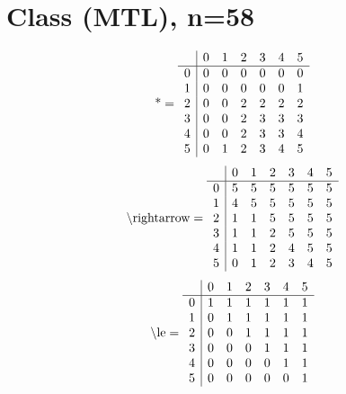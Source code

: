 \documentclass[11pt]{article}
\begin{document}
\section{Class (MTL), n=58}
\[\text{*} = 
\begin{array}{r | r r r r r r}
 & 0 & 1 & 2 & 3 & 4 & 5 \\ \hline
0 & 0 & 0 & 0 & 0 & 0 & 0 \\
1 & 0 & 0 & 0 & 0 & 0 & 1 \\
2 & 0 & 0 & 2 & 2 & 2 & 2 \\
3 & 0 & 0 & 2 & 3 & 3 & 3 \\
4 & 0 & 0 & 2 & 3 & 3 & 4 \\
5 & 0 & 1 & 2 & 3 & 4 & 5 \\
\end{array}
\]
\[\text{\textbackslash rightarrow} = 
\begin{array}{r | r r r r r r}
 & 0 & 1 & 2 & 3 & 4 & 5 \\ \hline
0 & 5 & 5 & 5 & 5 & 5 & 5 \\
1 & 4 & 5 & 5 & 5 & 5 & 5 \\
2 & 1 & 1 & 5 & 5 & 5 & 5 \\
3 & 1 & 1 & 2 & 5 & 5 & 5 \\
4 & 1 & 1 & 2 & 4 & 5 & 5 \\
5 & 0 & 1 & 2 & 3 & 4 & 5 \\
\end{array}
\]
\[\text{\textbackslash le} = 
\begin{array}{r | r r r r r r}
 & 0 & 1 & 2 & 3 & 4 & 5 \\ \hline
0 & 1 & 1 & 1 & 1 & 1 & 1 \\
1 & 0 & 1 & 1 & 1 & 1 & 1 \\
2 & 0 & 0 & 1 & 1 & 1 & 1 \\
3 & 0 & 0 & 0 & 1 & 1 & 1 \\
4 & 0 & 0 & 0 & 0 & 1 & 1 \\
5 & 0 & 0 & 0 & 0 & 0 & 1 \\
\end{array}
\]
\end{document}
